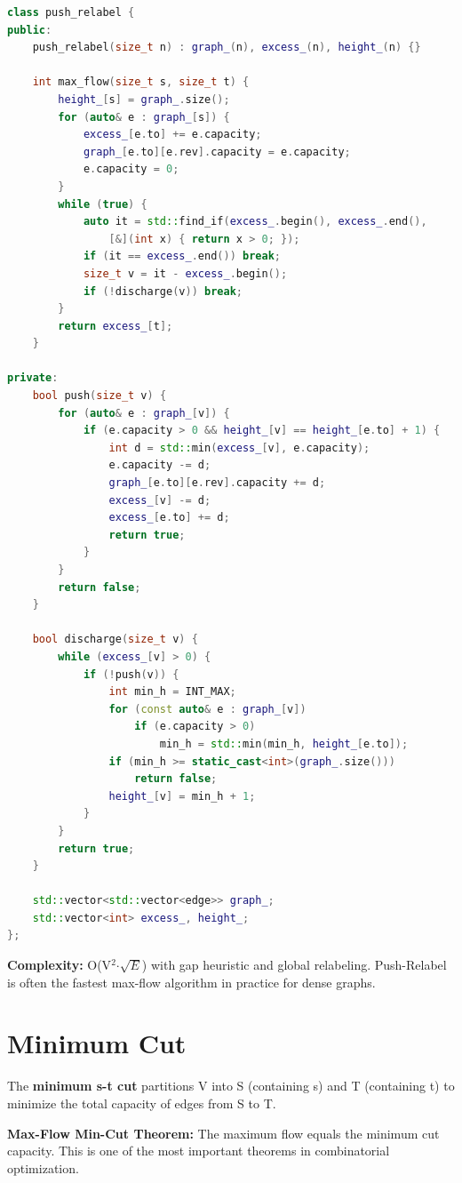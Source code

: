 \begin{lstlisting}[language=C++]
class push_relabel {
public:
    push_relabel(size_t n) : graph_(n), excess_(n), height_(n) {}

    int max_flow(size_t s, size_t t) {
        height_[s] = graph_.size();
        for (auto& e : graph_[s]) {
            excess_[e.to] += e.capacity;
            graph_[e.to][e.rev].capacity = e.capacity;
            e.capacity = 0;
        }
        while (true) {
            auto it = std::find_if(excess_.begin(), excess_.end(),
                [&](int x) { return x > 0; });
            if (it == excess_.end()) break;
            size_t v = it - excess_.begin();
            if (!discharge(v)) break;
        }
        return excess_[t];
    }

private:
    bool push(size_t v) {
        for (auto& e : graph_[v]) {
            if (e.capacity > 0 && height_[v] == height_[e.to] + 1) {
                int d = std::min(excess_[v], e.capacity);
                e.capacity -= d;
                graph_[e.to][e.rev].capacity += d;
                excess_[v] -= d;
                excess_[e.to] += d;
                return true;
            }
        }
        return false;
    }

    bool discharge(size_t v) {
        while (excess_[v] > 0) {
            if (!push(v)) {
                int min_h = INT_MAX;
                for (const auto& e : graph_[v])
                    if (e.capacity > 0)
                        min_h = std::min(min_h, height_[e.to]);
                if (min_h >= static_cast<int>(graph_.size()))
                    return false;
                height_[v] = min_h + 1;
            }
        }
        return true;
    }

    std::vector<std::vector<edge>> graph_;
    std::vector<int> excess_, height_;
};
\end{lstlisting}

\textbf{Complexity:} O(V$^{2}$$\cdot $$\sqrt {E}$) with gap heuristic and global relabeling. Push-Relabel is often the fastest max-flow algorithm in practice for dense graphs.

\section{Minimum Cut}

The \textbf{minimum s-t cut} partitions V into S (containing s) and T (containing t) to minimize the total capacity of edges from S to T.

\textbf{Max-Flow Min-Cut Theorem:} The maximum flow equals the minimum cut capacity. This is one of the most important theorems in combinatorial optimization.

